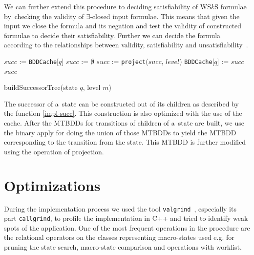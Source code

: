  We can further extend this procedure to deciding satisfiability of WS$k$S
 formulae by~checking the validity of $\exists$-closed input formulae. This
 means that given the input we close the formula and its negation and test the
 validity of constructed formulae to decide their satisfiability. Further we can
 decide the formula according to the relationships between validity,
 satisfiability and unsatisfiability~\cite{logics}.
 
\begin{function}[h!]
		\BlankLine
		\nl $\mathit{succ}$ := \texttt{BDDCache}[$q$]\;
		\nl {}
		\nl $\mathit{succ}$ := $\emptyset$\;
		\nl{}
		\nl $\mathit{succ}$ := \texttt{project}($\mathit{succ}$,
		$\mathit{level}$)\; \nl \texttt{BDDCache}[$q$] := $\mathit{succ}$\;
		\nl \Return $\mathit{succ}$\;
		\caption{buildSuccessorTree(state $q$, level $m$)}\label{impl-succ}
	\end{function}
\newpage
 The successor of a~state can be constructed out of its children
 as described by the function \ref{impl-succ}.
 This construction is also optimized with the use of the cache. After the MTBDDs
 for transitions of children of a~state are built, we use the binary apply for doing
 the union of those MTBDDs to yield the MTBDD corresponding to the transition
 from the state. This MTBDD is further modified using the operation of
 projection.
 
 \section{Optimizations}\label{optimizations}
 
 During the implementation process we used the tool
 \texttt{valgrind}~\cite{valgrind}, especially its part \texttt{callgrind}, to
 profile the implementation in C++ and tried to identify weak spots of the
 application.
 One of the most frequent operations in the procedure are the relational
 operators on the classes representing macro-states used e.g. for pruning the
 state search, macro-state comparison and operations with worklist.
 
